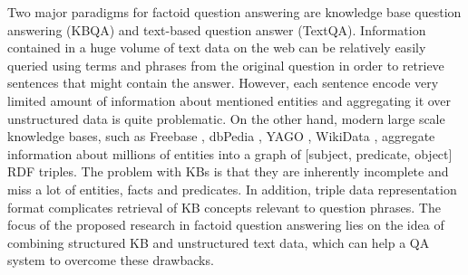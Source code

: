 Two major paradigms for factoid question answering are knowledge base question answering (KBQA) and text-based question answer (TextQA).
Information contained in a huge volume of text data on the web can be relatively easily queried using terms and phrases from the original question in order to retrieve sentences that might contain the answer.
However, each sentence encode very limited amount of information about mentioned entities and aggregating it over unstructured data is quite problematic.
On the other hand, modern large scale knowledge bases, such as Freebase \cite{Bollacker:2008:FCC:1376616.1376746}, dbPedia \cite{auer2007dbpedia}, YAGO \cite{yago3}, WikiData \cite{vrandevcic2014wikidata}, aggregate information about millions of entities into a graph of [subject, predicate, object] RDF triples.
The problem with KBs is that they are inherently incomplete and miss a lot of entities, facts and predicates.
In addition, triple data representation format complicates retrieval of KB concepts relevant to question phrases.
The focus of the proposed research in factoid question answering lies on the idea of combining structured KB and unstructured text data, which can help a QA system to overcome these drawbacks.




